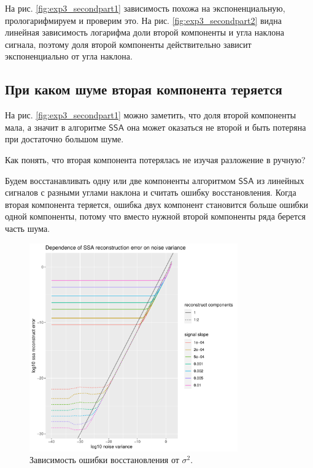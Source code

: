 \documentclass[specialist, substylefile = spbureport.rtx,
    subf,href,colorlinks=true, 12pt]{disser}
\newcommand{\SSA}{\mathsf{SSA}}
\begin{document}

        На рис. \ref{fig:exp3_secondpart1} зависимость похожа на экспоненциальную, прологарифмируем и проверим это.
        На рис. \ref{fig:exp3_secondpart2} видна линейная зависимость логарифма доли второй компоненты и угла наклона сигнала, поэтому доля второй компоненты действительно зависит экспоненциально от угла наклона.

    \subsection{При каком шуме вторая компонента теряется}
        На рис. \ref{fig:exp3_secondpart1} можно заметить, что доля второй компоненты мала, а значит в алгоритме $\SSA$ она может оказаться не второй и быть потеряна при достаточно большом шуме.

        Как понять, что вторая компонента потерялась не изучая разложение в ручную?
        
        Будем восстанавливать одну или две компоненты алгоритмом $\SSA$ из линейных сигналов с разными углами наклона и считать ошибку восстановления. Когда вторая компонента теряется, ошибка двух компонент становится больше ошибки одной компоненты, потому что вместо нужной второй компоненты ряда берется часть шума.
        
        \begin{figure}[h]
            \centering
            \includegraphics[width=0.8\textwidth]{experiment_3_lost1.pdf}
            \caption{Зависимость ошибки восстановления от $\sigma^2$.}
            \label{fig:exp3_lost1}
        \end{figure}
\end{document}
